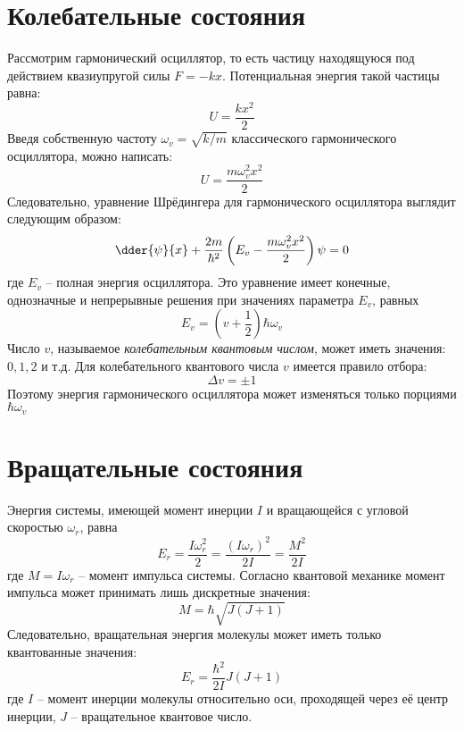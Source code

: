 \section{Колебательные состояния}
Рассмотрим гармонический осциллятор, то есть частицу находящуюся под 
действием квазиупругой силы \( F = -kx \). Потенциальная энергия 
такой частицы равна:
\[ U = \frac{kx^2}{2} \]
Введя собственную частоту \( \omega_v = \sqrt{k/m} \) классического 
гармонического осциллятора, можно написать:
\[ U = \frac{m\omega^2_v x^2}{2} \]
Следовательно, уравнение Шрёдингера для гармонического осциллятора 
выглядит следующим образом:
\[ 
	\dder{\psi}{x} + \frac{2m}{\hbar^2}
	\left( E_v - \frac{m\omega^2_v x^2}{2}\right)\psi = 0
\]
где \( E_v \) -- полная энергия осциллятора. Это уравнение имеет 
конечные, однозначные и непрерывные решения при значениях параметра 
\( E_v \), равных
\[ E_v = \left(v + \frac{1}{2}\right)\hbar\omega_v \]
Число \( v \), называемое \emph{колебательным квантовым числом}, 
может иметь значения: \( 0, 1, 2 \) и т.д.
Для колебательного квантового числа \( v \) имеется правило отбора:
\[ \Delta v = \pm 1 \]
Поэтому энергия гармонического осциллятора может изменяться только 
порциями \( \hbar\omega_v \)

\section{Вращательные состояния}
Энергия системы, имеющей момент инерции \( I \) и вращающейся с 
угловой скоростью \( \omega_r \), равна 
\[ 
	E_r = \frac{I\omega^2_r}{2} = \frac{(I\omega_r)^2}{2I} = 
	\frac{M^2}{2I}
\]
где \( M = I\omega_r \) -- момент импульса системы. Согласно 
квантовой механике момент импульса может принимать лишь 
дискретные значения:
\[ M = \hbar\sqrt{J(J+1)} \]
Следовательно, вращательная энергия молекулы может иметь только 
квантованные значения:
\[ E_r = \frac{\hbar^2}{2I}J(J+1) \]
где \( I \) -- момент инерции молекулы относительно оси, проходящей 
через её центр инерции, \( J \) -- вращательное квантовое число.

\newpage
